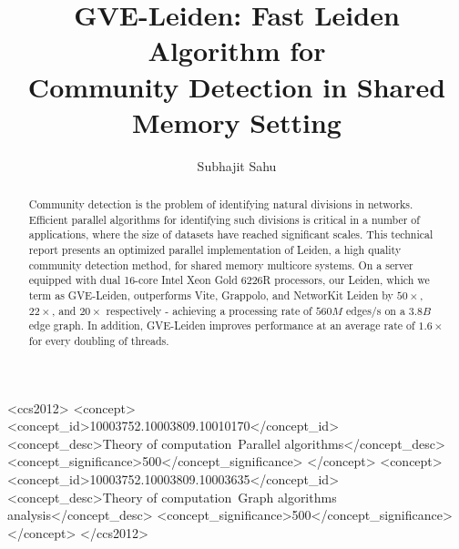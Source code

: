 \documentclass[sigconf,nonacm]{acmart}
\begin{document}
\title[GVE-Leiden: Fast Leiden Algorithm for Community Detection in Shared Memory Setting]{GVE-Leiden: Fast Leiden Algorithm for\\Community Detection in Shared Memory Setting}


\author{Subhajit Sahu}



\begin{abstract}
Community detection is the problem of identifying natural divisions in networks. Efficient parallel algorithms for identifying such divisions is critical in a number of applications, where the size of datasets have reached significant scales. This technical report presents an optimized parallel implementation of Leiden, a high quality community detection method, for shared memory multicore systems. On a server equipped with dual 16-core Intel Xeon Gold 6226R processors, our Leiden, which we term as GVE-Leiden, outperforms Vite, Grappolo, and NetworKit Leiden by $50\times$, $22\times$, and $20\times$ respectively - achieving a processing rate of $560 M$ edges/s on a $3.8 B$ edge graph. In addition, GVE-Leiden improves performance at an average rate of $1.6\times$ for every doubling of threads.
\end{abstract}

\begin{CCSXML}
<ccs2012>
<concept>
<concept_id>10003752.10003809.10010170</concept_id>
<concept_desc>Theory of computation~Parallel algorithms</concept_desc>
<concept_significance>500</concept_significance>
</concept>
<concept>
<concept_id>10003752.10003809.10003635</concept_id>
<concept_desc>Theory of computation~Graph algorithms analysis</concept_desc>
<concept_significance>500</concept_significance>
</concept>
</ccs2012>
\end{CCSXML}
\end{document}
